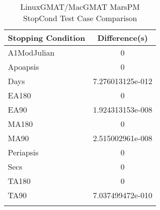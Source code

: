 \begin{table}[htbp!]
\centering
\caption{ LinuxGMAT/MacGMAT MarsPM StopCond Test Case Comparison}
      \begin{tabular}{lc}
      \hline\hline
          Stopping Condition & Difference(s) \\
         \hline
         A1ModJulian & 0 \\
         Apoapsis & 0 \\
         Days & 7.276013125e-012 \\
         EA180 & 0 \\
         EA90 & 1.924313153e-008 \\
         MA180 & 0 \\
         MA90 & 2.515002961e-008 \\
         Periapsis & 0 \\
         Secs & 0 \\
         TA180 & 0 \\
         TA90 & 7.037499472e-010 \\
      \hline\hline
      \label{Table: LinuxGMAT-MacGMAT MarsPM StopCond Table} 
\end{tabular}
\end{table}

